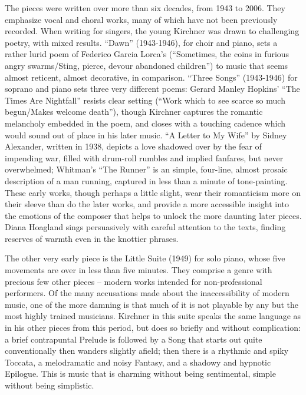 The pieces were written over more than six decades, from 1943 to 2006. They emphasize vocal and choral works, many of which have not been previously recorded. When writing for singers, the young Kirchner was drawn to challenging poetry, with mixed results. “Dawn” (1943-1946), for choir and piano, sets a rather lurid poem of Federico Garcia Lorca’s (“Sometimes, the coins in furious angry swarms/Sting, pierce, devour abandoned children”) to music that seems almost reticent, almost decorative, in comparison. “Three Songs” (1943-1946) for soprano and piano sets three very different poems: Gerard Manley Hopkins’ “The Times Are Nightfall” resists clear setting (“Work which to see scarce so much begun/Makes welcome death”), though Kirchner captures the romantic melancholy embedded in the poem, and closes with a touching cadence which would sound out of place in his later music. “A Letter to My Wife” by Sidney Alexander, written in 1938, depicts a love shadowed over by the fear of impending war, filled with drum-roll rumbles and implied fanfares, but never overwhelmed; Whitman’s “The Runner” is an simple, four-line, almost prosaic description of a man running, captured in less than a minute of tone-painting. These early works, though perhaps a little slight, wear their romanticism more on their sleeve than do the later works, and provide a more accessible insight into the emotions of the composer that helps to unlock the more daunting later pieces. Diana Hoagland sings persuasively with careful attention to the texts, finding reserves of warmth even in the knottier phrases.

The other very early piece is the Little Suite (1949) for solo piano, whose five movements are over in less than five minutes. They comprise a genre with precious few other pieces – modern works intended for non-professional performers. Of the many accusations made about the inaccessibility of modern music, one of the more damning is that much of it is not playable by any but the most highly trained musicians. Kirchner in this suite speaks the same language as in his other pieces from this period, but does so briefly and without complication: a brief contrapuntal Prelude is followed by a Song that starts out quite conventionally then wanders slightly afield; then there is a rhythmic and spiky Toccata, a melodramatic and noisy Fantasy, and a shadowy and hypnotic Epilogue. This is music that is charming without being sentimental, simple without being simplistic.

